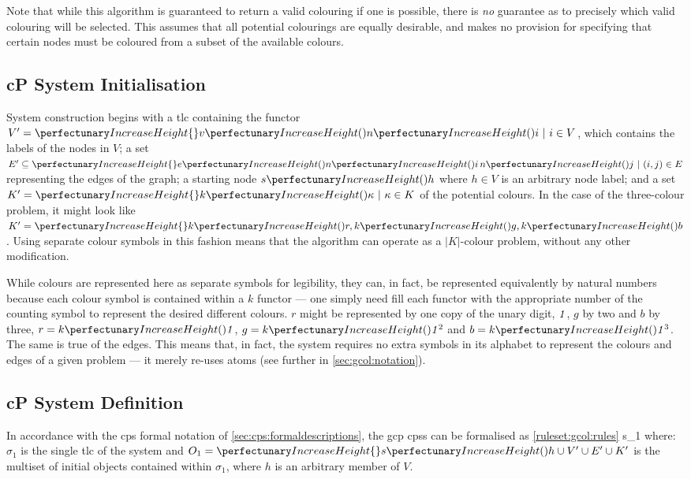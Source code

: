 Note that while this algorithm is guaranteed to return a valid colouring if one is possible, there is \emph{no} guarantee as to precisely which valid colouring will be selected.  This  assumes that all potential colourings are equally desirable, and makes no provision for specifying that certain nodes must be coloured from a subset of the available colours.

\subsection{\label{sec:gcol:sysinit}cP System Initialisation}
System construction begins with a \gls{tlc} containing the \gls{functor} \(V' = \cpset{\cpfunc{v}{\cpfunc{n}{i}} ~|~i \in V}\), which contains the labels of the nodes in \(V\); a set \(E' \subseteq \cpset{\cpfunc{e}{\cpfunc{n}{i} \, \cpfunc{n}{j}} ~|~(i,j) \in E}\) representing the edges of the graph; a starting node \(\cpfunc{s}{h}\) where \(h \in V\) is an arbitrary node label; and a set \(K' = \cpset{\cpfunc{k}{\kappa} ~|~ \kappa \in K}\) of  the potential colours.  In the case of the three-colour problem, it might look like \(K' = \cpset{\cpfunc{k}{r}, \cpfunc{k}{g}, \cpfunc{k}{b}}\). Using separate colour symbols in this fashion means that the algorithm can operate as a \(|K|\)-colour problem, without any other modification.

While colours are represented here as separate symbols for legibility, they can, in fact, be represented equivalently by natural numbers because each colour symbol is contained within a \(k\) \gls{functor} --- one simply need fill each \gls{functor} with the appropriate number of the counting symbol to represent the desired different colours.  \Eg{} \(r\) might be represented by one copy of the unary digit, \(\mathit{1}\), \(g\) by two and \(b\) by three, \ie{} \(r = \cpfunc{k}{\cpundig}\), \(g = \cpfunc{k}{\cpundig^2}\) and \(b = \cpfunc{k}{\cpundig^3}\).  The same is true of the edges.  This means that, in fact, the system requires no extra symbols in its alphabet to represent the colours and edges of a given problem --- it merely re-uses atoms (see further in \cref{sec:gcol:notation}).

\subsection{\label{sec:gcol:notation}cP System Definition}

In accordance with the \gls{cps} formal notation of \cref{sec:cps:formaldescriptions}, the \gls{gcp} \glspl{cps} can be formalised as
{}
{}
{\cref{ruleset:gcol:rules}}
{}
{s_1} where: \(\sigma_1\) is the single \gls{tlc} of the system and \(O_1 = \cpset{\cpfunc{s}{h}} \cup V' \allowbreak \cup E' \allowbreak \cup K'\) is the multiset of initial objects contained within \(\sigma_1\), where \(h\) is an arbitrary member of \(V\).


